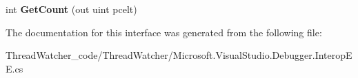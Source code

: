 \begin{DoxyCompactItemize}
\item 
\hypertarget{interface_microsoft_1_1_visual_studio_1_1_debugger_1_1_interop_e_e_1_1_i_enum_debug_fields_a9e3840410f9180ec7aa8fc26eeb88ab7}{int {\bfseries Get\+Count} (out uint pcelt)}\label{interface_microsoft_1_1_visual_studio_1_1_debugger_1_1_interop_e_e_1_1_i_enum_debug_fields_a9e3840410f9180ec7aa8fc26eeb88ab7}

\end{DoxyCompactItemize}


The documentation for this interface was generated from the following file\+:\begin{DoxyCompactItemize}
\item 
Thread\+Watcher\+\_\+code/\+Thread\+Watcher/Microsoft.\+Visual\+Studio.\+Debugger.\+Interop\+E\+E.\+cs\end{DoxyCompactItemize}
